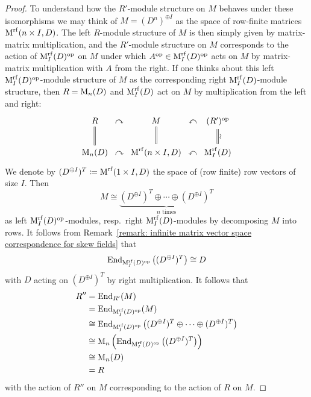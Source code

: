 \begin{proof}
  To understand how the $R'$-module structure on $M$ behaves under these isomorphisms we may think of $M = (D^n)^{\oplus I}$ as the space of row-finite matrices $\operatorname{M}^{{\operatorname{rf}}}(n \times I, D)$.
  The left $R$-module structure of $M$ is then simply given by matrix-matrix multiplication, and the $R'$-module structure on $M$ corresponds to the action of $\operatorname{M}_I^{{\operatorname{rf}}}(D)^{\operatorname{op}}$ on $M$ under which $A^{\operatorname{op}} \in \operatorname{M}_I^{{\operatorname{rf}}}(D)^{\operatorname{op}}$ acts on $M$ by matrix-matrix multiplication with $A$ from the right.
  If one thinks about this left $\operatorname{M}_I^{{\operatorname{rf}}}(D)^{\operatorname{op}}$-module structure of $M$ as the corresponding right $\operatorname{M}_I^{{\operatorname{rf}}}(D)$-module structure, then $R = \operatorname{M}_n(D)$ and $\operatorname{M}_I^{{\operatorname{rf}}}(D)$ act on $M$ by multiplication from the left and right:
  \[
    \begin{tikzcd}[column sep = 0em]
        R
        \arrow[equal]{d}
      &\curvearrowright
      & M
        \arrow[equal]{d}
      & \curvearrowleft
      & (R')^\op
        \arrow[equal]{d}[right]{\rotatebox[origin=c]{90}{$\sim$}}
      \\
        \Mat_n(D)
      & \curvearrowright
      & \Mat^{\rf}(n \times I, D)
      & \curvearrowleft
      & \Mat_I^{\rf}(D)
    \end{tikzcd}
  \]
  We denote by $(D^{\oplus I})^T \coloneqq \operatorname{M}^{\operatorname{rf}}(1 \times I, D)$ the space of (row finite) row vectors of size $I$.
  Then
  \[
          M
    \cong \underbrace{ (D^{\oplus I})^T \oplus \dotsb \oplus (D^{\oplus I})^T }_{\text{$n$ times}}
  \]
  as left $\operatorname{M}_I^{{\operatorname{rf}}}(D)^{\operatorname{op}}$-modules, resp.\ right $\operatorname{M}_I^{{\operatorname{rf}}}(D)$-modules by decomposing $M$ into rows.
  It follows from Remark~\ref{remark: infinite matrix vector space correspondence for skew fields} that
  \[
          \operatorname{End}_{ \operatorname{M}_I^{{\operatorname{rf}}}(D)^{\operatorname{op}} }\left( (D^{\oplus I})^T \right) 
    \cong D
  \]
  with $D$ acting on $(D^{\oplus I})^T$ by right multiplication.
  It follows that
  \begin{align*}
            R''
    &=      \operatorname{End}_{R'}(M)  \\
    &=      \operatorname{End}_{ \operatorname{M}_I^{{\operatorname{rf}}}(D)^{\operatorname{op}} }( M )   \\
    &\cong  \operatorname{End}_{ \operatorname{M}_I^{{\operatorname{rf}}}(D)^{\operatorname{op}} }\left( (D^{\oplus I})^T \oplus \dotsb \oplus (D^{\oplus I})^T \right) \\
    &\cong  \operatorname{M}_n\left( \operatorname{End}_{ \operatorname{M}_I^{{\operatorname{rf}}}(D)^{\operatorname{op}} }\left( (D^{\oplus I})^T \right) \right)  \\
    &\cong  \operatorname{M}_n(D) \\
    &=      R
  \end{align*}
  with the action of $R''$ on $M$ corresponding to the action of $R$ on $M$.

\end{proof}
